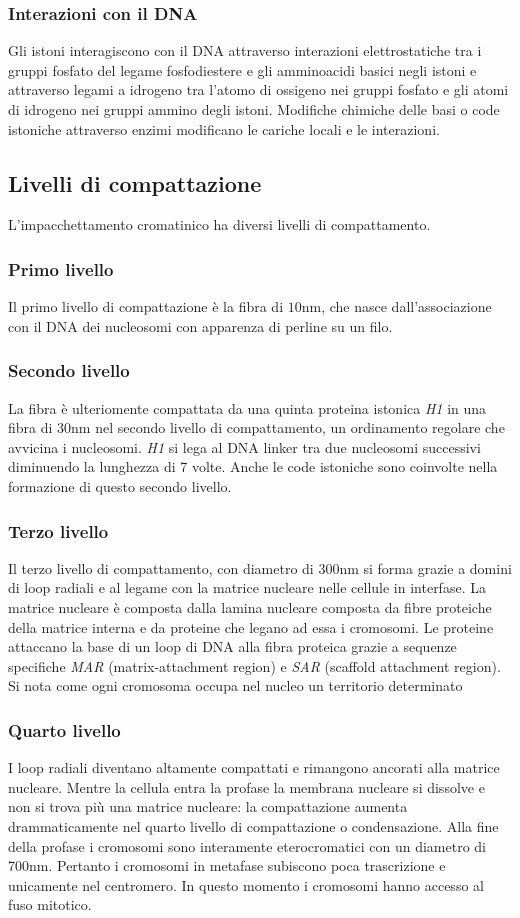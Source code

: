\subsubsection{Interazioni con il DNA}
Gli istoni interagiscono con il DNA attraverso interazioni elettrostatiche tra i gruppi fosfato del legame fosfodiestere e gli amminoacidi basici negli istoni e attraverso legami a
idrogeno tra l'atomo di ossigeno nei gruppi fosfato e gli atomi di idrogeno nei gruppi ammino degli istoni. Modifiche chimiche delle basi o code istoniche attraverso enzimi 
modificano le cariche locali e le interazioni. 
\subsection{Livelli di compattazione}
L'impacchettamento cromatinico ha diversi livelli di compattamento. 
\subsubsection{Primo livello}
Il primo livello di compattazione \`e la fibra di $10\si{\nano\metre}$, che nasce dall'associazione con il DNA dei
nucleosomi con apparenza di perline su un filo. 
\subsubsection{Secondo livello}
La fibra \`e ulteriomente compattata da una quinta proteina istonica \emph{H1} in una fibra di \num{30}\si{nm} nel secondo livello di 
compattamento, un ordinamento regolare che avvicina i nucleosomi. \emph{H1} si lega al DNA linker tra due nucleosomi successivi diminuendo la lunghezza di \num{7} volte. Anche le
code istoniche sono coinvolte nella formazione di questo secondo livello. 
\subsubsection{Terzo livello}
Il terzo livello di compattamento, con diametro di \num{300}\si{nm} si forma grazie a domini di loop radiali e al legame con la matrice nucleare nelle cellule in interfase. La
matrice nucleare \`e composta dalla lamina nucleare composta da fibre proteiche della matrice interna e da proteine che legano ad essa i cromosomi. Le proteine attaccano la
base di un loop di DNA alla fibra proteica grazie a sequenze specifiche \emph{MAR} (matrix-attachment region) e \emph{SAR} (scaffold attachment region). Si nota come ogni cromosoma
occupa nel nucleo un territorio determinato
\subsubsection{Quarto livello}
I loop radiali diventano altamente compattati e rimangono ancorati alla matrice nucleare. Mentre la cellula entra la profase la membrana nucleare si dissolve e non si trova pi\`u una
matrice nucleare: la compattazione aumenta drammaticamente nel quarto livello di compattazione o condensazione. Alla fine della profase i cromosomi sono interamente eterocromatici
con un diametro di \num{700}\si{nm}. Pertanto i cromosomi in metafase subiscono poca trascrizione e unicamente nel centromero. In questo momento i cromosomi hanno accesso al fuso
mitotico. 
